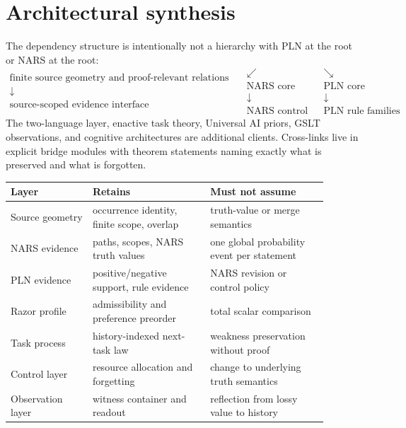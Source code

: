 \documentclass[11pt]{article}
\theoremstyle{remark}
\begin{document}
\section{Architectural synthesis}

The dependency structure is intentionally not a hierarchy with PLN at the
root or NARS at the root:
\[
\begin{array}{c}
\text{finite source geometry and proof-relevant relations}\\
\downarrow\\[-0.4em]
\text{source-scoped evidence interface}
\end{array}
\quad
\begin{array}{ccc}
\swarrow && \searrow\\[-0.4em]
\text{NARS core} && \text{PLN core}\\
\downarrow && \downarrow\\
\text{NARS control} && \text{PLN rule families}
\end{array}
\]
The two-language layer, enactive task theory, Universal AI priors, GSLT
observations, and cognitive architectures are additional clients.  Cross-links
live in explicit bridge modules with theorem statements naming exactly what is
preserved and what is forgotten.

\begin{center}
\begin{tabular}{>{\raggedright\arraybackslash}p{0.23\linewidth}
                >{\raggedright\arraybackslash}p{0.33\linewidth}
                >{\raggedright\arraybackslash}p{0.33\linewidth}}
\toprule
Layer & Retains & Must not assume \\
\midrule
Source geometry & occurrence identity, finite scope, overlap & truth-value or merge semantics \\
NARS evidence & paths, scopes, NARS truth values & one global probability event per statement \\
PLN evidence & positive/negative support, rule evidence & NARS revision or control policy \\
Razor profile & admissibility and preference preorder & total scalar comparison \\
Task process & history-indexed next-task law & weakness preservation without proof \\
Control layer & resource allocation and forgetting & change to underlying truth semantics \\
Observation layer & witness container and readout & reflection from lossy value to history \\
\bottomrule
\end{tabular}
\end{center}
\end{document}
